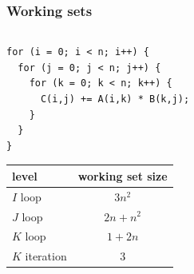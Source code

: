 \documentclass[12pt,dvipdfmx]{beamer}
\begin{document}
\begin{frame}[fragile]
\frametitle{Working sets}
\begin{columns}

\begin{column}{0.5\textwidth}
\begin{lstlisting}
for (i = 0; i < n; i++) {
  for (j = 0; j < n; j++) {
    for (k = 0; k < n; k++) {
      C(i,j) += A(i,k) * B(k,j);
    }
  }
}
\end{lstlisting}

\begin{tabular}{|l|c|}\hline
level    & working set size  \\\hline
$I$ loop & $3n^2$            \\  
$J$ loop & $2n + n^2$        \\  
$K$ loop & $1 + 2n$          \\
$K$ iteration & $3$          \\\hline
\end{tabular}
\end{column}

\begin{column}{0.5\textwidth}
\begin{center}
\def\svgwidth{0.9\textwidth}
{\tiny }
\end{center}
\end{column}
\end{columns}
\end{frame}
\end{document}

